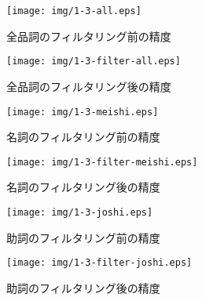 \documentclass[jnlpbbl]{jnlp_j}
\begin{document}
\begin{figure}[htbp]
 \begin{minipage}{0.5\hsize}
  \begin{center}
   \texttt{[image: img/1-3-all.eps]}
  \end{center}
  \caption{全品詞のフィルタリング前の精度}
  \label{1-3-all}
 \end{minipage}
 \begin{minipage}{0.5\hsize}
  \begin{center}
   \texttt{[image: img/1-3-filter-all.eps]}
  \end{center}
  \caption{全品詞のフィルタリング後の精度}
  \label{1-3-filter-all}
 \end{minipage}
\end{figure}

\begin{figure}[htbp]
 \begin{minipage}{0.5\hsize}
  \begin{center}
   \texttt{[image: img/1-3-meishi.eps]}
  \end{center}
  \caption{名詞のフィルタリング前の精度}
  \label{1-3-meishi}
 \end{minipage}
 \begin{minipage}{0.5\hsize}
  \begin{center}
   \texttt{[image: img/1-3-filter-meishi.eps]}
  \end{center}
  \caption{名詞のフィルタリング後の精度}
  \label{1-3-filter-meishi}
 \end{minipage}
\end{figure}

\begin{figure}[htbp]
 \begin{minipage}{0.5\hsize}
  \begin{center}
   \texttt{[image: img/1-3-joshi.eps]}
  \end{center}
  \caption{助詞のフィルタリング前の精度}
  \label{1-3-joshi}
 \end{minipage}
 \begin{minipage}{0.5\hsize}
  \begin{center}
   \texttt{[image: img/1-3-filter-joshi.eps]}
  \end{center}
  \caption{助詞のフィルタリング後の精度}
  \label{1-3-filter-joshi}
 \end{minipage}
\end{figure}
\end{document}
